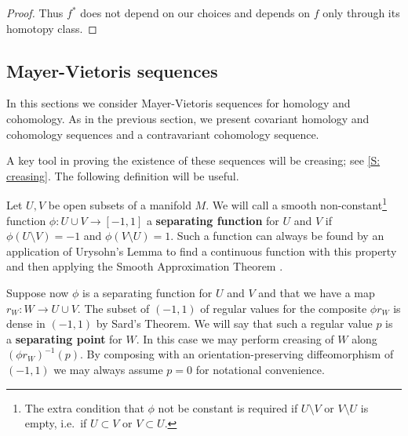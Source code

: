 \begin{proof}
	Thus $f^*$ does not depend on our choices and depends on $f$ only through its homotopy class.
\end{proof}

\begin{comment}
\begin{remark}\label{R: homology transfer}
	Analogously, given $f \colon M \to N$, one could also define a contravariant pullback functor of homology groups $f^*: H_*^\Gamma(N) \to H_*^\Gamma(M)$ if $f$ is proper and $M$ and $N$ are both oriented (so that the pullback can be oriented).
	The following lemma shows that the pullback of a compact map by a proper map is compact.
	For the orientation, we observe that given an oriented map $r_V \colon V \to N$ that represents $\uV$ and a map $g \colon M \to N$ that is properly homotopic to $f$ and transverse to $r_V$, the orientations of $V$ and $N$ induce a co-orientation on $r_V$ and so a co-orientation on the pullback $V \times_N M \to M$ by \cref{D: pullback coorient}.
	This in turn induces an orientation on $V \times_N M$ given the orientation of $M$.
\end{remark}
\end{comment}


\subsection{Mayer-Vietoris sequences}

In this sections we consider Mayer-Vietoris sequences for homology and cohomology.
As in the previous section, we present covariant homology and cohomology sequences and a contravariant cohomology sequence.

A key tool in proving the existence of these sequences will be creasing; see \cref{S: creasing}.
The following definition will be useful.

\begin{definition}
	Let $U,V$ be open subsets of a manifold $M$.
	We will call a smooth non-constant\footnote{The extra condition that $\phi$ not be constant is required if $U\setminus V$ or $V\setminus U$ is empty, i.e.\ if $U \subset V$ or $V \subset U$.} function $\phi \colon U \cup V \to [-1,1]$ a \textbf{separating function} for $U$ and $V$ if $\phi(U\setminus V) = -1$ and $\phi(V\setminus U) = 1$.
	Such a function can always be found by an application of Urysohn's Lemma to find a continuous function with this property and then applying the Smooth Approximation Theorem \cite[Theorem III.2.5]{Kos93}.

	Suppose now $\phi$ is a separating function for $U$ and $V$ and that we have a map $r_W \colon W \to U \cup V$.
	The subset of $(-1,1)$ of regular values for the composite $\phi r_W$ is dense in $(-1,1)$ by Sard's Theorem.
	We will say that such a regular value $p$ is a \textbf{separating point} for $W$.
	In this case we may perform creasing of $W$ along $(\phi r_W)^{-1}(p)$.
	By composing with an orientation-preserving diffeomorphism of $(-1,1)$ we may always assume $p = 0$ for notational convenience.
\end{definition}

